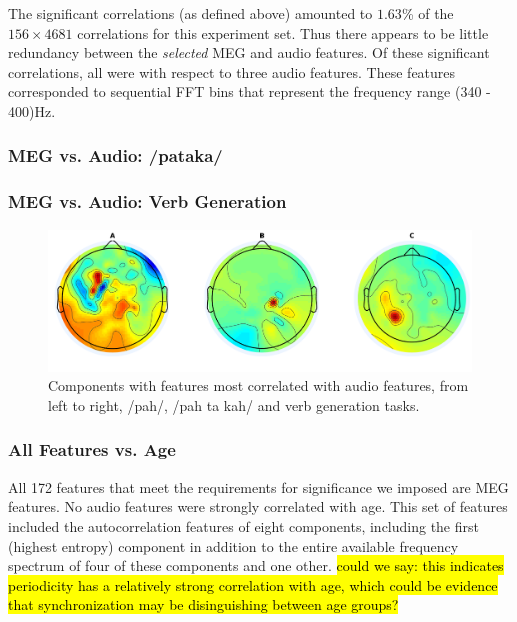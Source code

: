 \documentclass[a4paper]{article}
\newcommand{\DK}[1]{{\small \textcolor{blue}{\hl{#1}}}}
\begin{document}
The significant correlations (as defined above) amounted to $1.63$\% of the $156 \times 4681$ correlations for this experiment set. Thus there appears to be little redundancy between the \textit{selected} MEG and audio features. Of these significant correlations, all were with respect to three audio features. These features corresponded to sequential FFT bins that represent the frequency range (340 - 400)Hz.

\subsubsection{MEG vs. Audio: /pataka/}




\subsubsection{MEG vs. Audio: Verb Generation}

\begin{figure}[t]
  \centering
  \includegraphics[width=\linewidth]{AllComponents.png}
  \caption{Components with features most correlated with audio features, from left to right, /pah/, /pah ta kah/ and verb generation tasks.}
  \label{fig:components}
\end{figure}

\subsubsection{All Features vs. Age}

All 172 features that meet the requirements for significance we imposed are MEG features. No audio features were strongly correlated with age. This set of features included the autocorrelation features of eight components, including the first (highest entropy) component in addition to the entire available frequency spectrum of four of these components and one other. \DK{could we say: this indicates periodicity has a relatively strong correlation with age, which could be evidence that synchronization may be disinguishing between age groups?}
\end{document}
